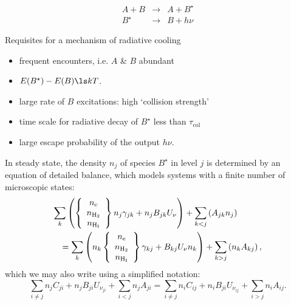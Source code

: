 \centering
\begin{minipage}[t]{6cm}
\begin{eqnarray*}
 A + B  & \rightarrow &  A + B^{\star} \\
 B^{\star} & \rightarrow  & B + h\nu  
\end{eqnarray*}
\end{minipage} 
\hfill
\begin{minipage}[t]{19cm}
Requisites for a mechanism of radiative cooling
\begin{itemize}

\item frequent encounters, i.e. $A$ \& $B$ abundant
\item $E(B^{\star}) - E(B) \ls k T$. 
\item large rate of $B$ excitations:  high  `collision strength'
\item time scale for radiative decay of  $B^\star$ less than  $\tau_\mathrm{col}$ 
\item large escape probability of the output $h\nu$.

\end{itemize}
\end{minipage} 
\vfill



\foilhead{}

\raggedright

In steady state, the density $n_j$ of species $B^\star$ in level $j$
is determined by an equation of detailed balance, which models systems
with a finite number of microscopic states:
\begin{eqnarray*}
\lefteqn{\sum_k    \left(    \left\{ \begin{array}{c}  n_\mathrm{e} \\
    n_\mathrm{H_2} \\  n_\mathrm{H_I} \end{array} \right\}    n_j
  \gamma_{jk} +  {n}_{j} B_{jk} U_\nu \right) + \sum_{k<j} \left( A_{jk} n_j  \right)   } \\   
& &     =    \sum_k \left(  n_k      \left\{ \begin{array}{c}  n_\mathrm{e} \\  n_\mathrm{H_2} \\  n_\mathrm{H_I} \end{array} \right\}  \gamma_{kj} + B_{kj} U_\nu n_k \right) + \sum_{k>j} \left( n_k A_{kj} \right),
\end{eqnarray*}
\pause
which we may also write using a  simplified notation: 
\[\sum_{i{\neq}j}
{n}_{j}{C}_{ji} + {n}_{j}{B}_{ji} U_{\nu_{ji}} +
\sum_{i<j}{n}_{j}{A}_{ji} = \sum_{i{\neq}j}{n}_{i}{C}_{ij} +  {n}_{i}{B}_{ji} U_{\nu_{ij}} + \sum_{i>j}{n}_{i}{A}_{ij}. 
\]

